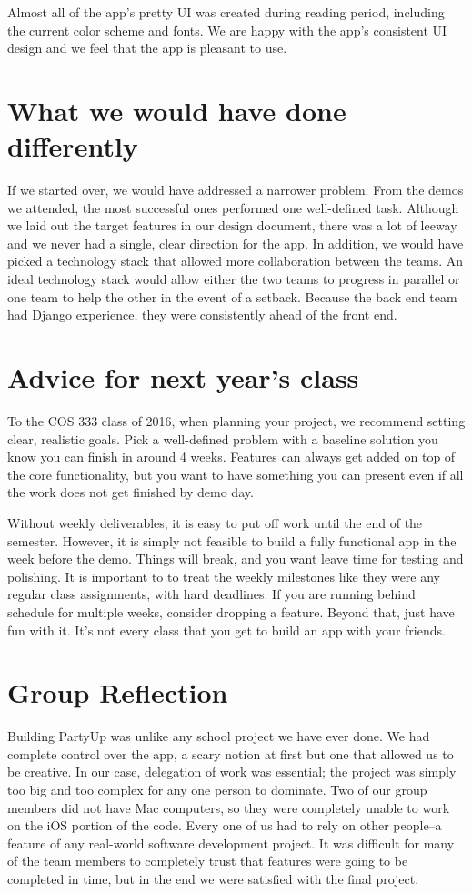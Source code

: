 \documentclass[12pt]{article}
\begin{document}
Almost all of the app's pretty UI was created during reading period, including the current color scheme and fonts.
We are happy with the app's consistent UI design and we feel that the app is pleasant to use.

\section{What we would have done differently}

If we started over, we would have addressed a narrower problem. 
From the demos we attended, the most successful ones performed one well-defined task. 
Although we laid out the target features in our design document, there was a lot of leeway and we never had a single, clear direction for the app.
In addition, we would have picked a technology stack that allowed more collaboration between the teams.
An ideal technology stack would allow either the two teams to progress in parallel or one team to help the other in the event of a setback. 
Because the back end team had Django experience, they were consistently ahead of the front end.

\section{Advice for next year's class}

To the COS 333 class of 2016, when planning your project, we recommend setting clear, realistic goals. 
Pick a well-defined problem with a baseline solution you know you can finish in around 4 weeks.
Features can always get added on top of the core functionality, but you want to have something you
can present even if all the work does not get finished by demo day.

Without weekly deliverables, it is easy to put off work until the end of the semester.
However, it is simply not feasible to build a fully functional app in the week before the demo. 
Things will break, and you want leave time for testing and polishing.
It is important to to treat the weekly milestones like they were any regular class assignments, with hard deadlines. 
If you are running behind schedule for multiple weeks, consider dropping a feature.
Beyond that, just have fun with it.
It's not every class that you get to build an app with your friends.

\section{Group Reflection}

Building PartyUp was unlike any school project we have ever done. 
We had complete control over the app, a scary notion at first but one that allowed us to be creative. 
In our case, delegation of work was essential; the project was simply too big and too complex for any one person to dominate. 
Two of our group members did not have Mac computers, so they were completely unable to work on the iOS portion of the code. 
Every one of us had to rely on other people--a feature of any real-world software development project. 
It was difficult for many of the team members to completely trust that features were going to be completed in time, but in the end we were satisfied with the final project.
\end{document}
